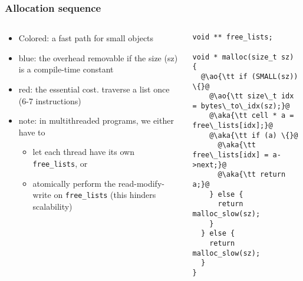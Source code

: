 \documentclass[11pt,dvipdfmx]{beamer}
\newcommand{\ao}[1]{{\color{blue}#1}}
\newcommand{\aka}[1]{{\color{red}#1}}
\begin{document}
\begin{frame}[fragile]
\frametitle{Allocation sequence}
\begin{columns}
\begin{column}{0.5\textwidth}
\begin{itemize}
\item \ao{C}\aka{o}\ao{l}\aka{o}\ao{r}\aka{e}\ao{d}\aka{:} 
  a fast path for small objects
\item \ao{blue:} the overhead removable if the size (sz)
  is a compile-time constant 
\item \aka{red:} the essential cost. traverse a list once (6-7 instructions)
\item note: in multithreaded programs, we either have to
  \begin{itemize}
  \item let each thread have its own {\tt free\_lists}, or
  \item atomically perform \aka{the read-modify-write on {\tt free\_lists}}
    (this hinders scalability)
  \end{itemize}
\end{itemize}
\end{column}

\begin{column}{0.42\textwidth}
\begin{lstlisting}
void ** free_lists;

void * malloc(size_t sz) {
  @\ao{\tt if (SMALL(sz)) \{}@
    @\ao{\tt size\_t idx = bytes\_to\_idx(sz);}@
    @\aka{\tt cell * a = free\_lists[idx];}@
    @\aka{\tt if (a) \{}@
      @\aka{\tt free\_lists[idx] = a->next;}@
      @\aka{\tt return a;}@
    } else {
      return malloc_slow(sz);
    }
  } else {
    return malloc_slow(sz);
  }
}
\end{lstlisting}
\end{column}
\end{columns}
\end{frame}
\fi
\end{document}
